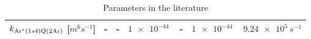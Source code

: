 \begin{table}[h!]
\begin{tabular}{lcccccc}
        $k_{\mathrm{Ar}^*(1s4) Q(2\mathrm{Ar})}$  [$\unit{m^6 s^{-1}}$] & - & - &  $\SI{1e-44}{}$  & - & $\SI{1e-44}{}$ & $\SI{9.24e5}{s^{-1}}$  \\[0.7em]
        
        
        \bottomrule
    
    \end{tabular}
    \caption{Parameters in the literature}
    \label{tab:ArN2litearture}
\end{table}